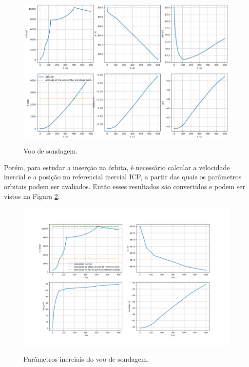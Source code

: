 \begin{figure}[H]
    \begin{center}
        \caption{Voo de sondagem.}
        \includegraphics[width=6in]{figuras/voosondagema.png}
        \label{fig:sondagem}
     \end{center}
\end{figure}
\newpage


Porém, para estudar a inserção na órbita, é necessário calcular a velocidade inercial e a posição no referencial inercial ICP, a partir das quais os parâmetros orbitais podem ser avaliados. Então esses resultados são convertidos e podem ser vistos na Figura \ref{fig:parametrossondagem}.

\begin{figure}[H]
    \begin{center}
        \caption{Parâmetros inerciais do voo de sondagem.}
        \includegraphics[width=7in]{figuras/parametrossondagem.png}
        \label{fig:parametrossondagem}
     \end{center}
\end{figure}

